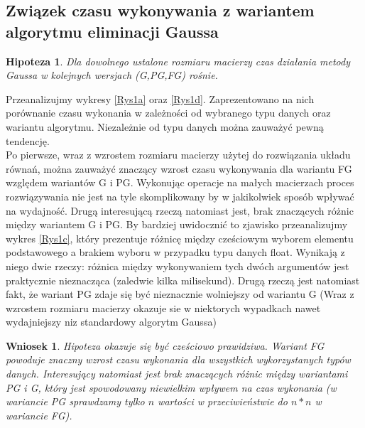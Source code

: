\documentclass[10pt]{article}
\newtheorem{hip}{Hipoteza}
\newtheorem{wn}{Wniosek}
\begin{document}
\subsection{Związek czasu wykonywania z wariantem algorytmu eliminacji Gaussa}
\begin{hip}
	Dla dowolnego ustalone rozmiaru macierzy czas działania metody Gaussa w kolejnych wersjach (G,PG,FG) rośnie.\label{hip:1}
\end{hip}
Przeanalizujmy wykresy \ref{Rys1a} oraz \ref{Rys1d}. Zaprezentowano na nich porównanie czasu wykonania w zależności od wybranego typu danych oraz wariantu algorytmu. Niezależnie od typu danych można zauważyć pewną tendencję.\\
Po pierwsze, wraz z wzrostem rozmiaru macierzy użytej do rozwiązania układu równań, można zauważyć znaczący wzrost czasu wykonywania dla wariantu FG względem wariantów G i PG. Wykonując operacje na małych macierzach proces rozwiązywania nie jest na tyle skomplikowany by w jakikolwiek sposób wpływać na wydajność.
Drugą interesującą rzeczą natomiast jest, brak znaczących różnic między wariantem G i PG. By bardziej uwidocznić to zjawisko przeanalizujmy wykres \ref{Rys1c}, który prezentuje różnicę między cześciowym wyborem elementu podstawowego a brakiem wyboru w przypadku typu danych float. Wynikają z niego dwie rzeczy: różnica między wykonywaniem tych dwóch argumentów jest praktycznie nieznacząca (zaledwie kilka milisekund). Drugą rzeczą jest natomiast fakt, że wariant PG zdaje się być nieznacznie wolniejszy od wariantu G (Wraz z wzrostem rozmiaru macierzy okazuje sie w niektorych wypadkach nawet wydajniejszy niz standardowy algorytm Gaussa)
\begin{wn}
	Hipoteza okazuje się być cześciowo prawidziwa. Wariant FG powoduje znaczny wzrost czasu wykonania dla wszystkich wykorzystanych typów danych. Interesujący natomiast jest brak znaczących różnic między wariantami PG i G, który jest spowodowany niewielkim wpływem na czas wykonania (w wariancie PG sprawdzamy tylko $n$ wartości w przeciwieństwie do $n*n$ w wariancie FG).\label{wn:1}
\end{wn}
\end{document}
